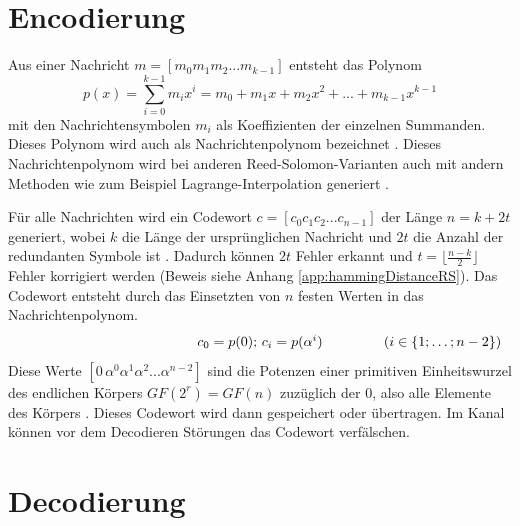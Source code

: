 \section{Encodierung}\label{sec:encoding}

Aus einer Nachricht  $m=[m_{0}m_{1}m_{2}...m_{k-1}]$ entsteht das Polynom \[p(x)=\sum_{i=0}^{k-1}m_ix^i=m_0+m_1x+m_2x^2+...+m_{k-1}x^{k-1}\] mit den Nachrichtensymbolen $m_i$ als Koeffizienten der einzelnen Summanden.
Dieses Polynom wird auch als Nachrichtenpolynom bezeichnet \cite{reedPolynomialCodesCertain1960}.
Dieses Nachrichtenpolynom wird bei anderen Reed-Solomon-Varianten auch mit andern Methoden wie zum Beispiel Lagrange-Interpolation generiert \cite{wendlingIntroductionReedSolomon2017}.

Für alle Nachrichten wird ein Codewort $c=[c_{0}c_{1}c_{2}...c_{n-1}]$ der Länge $n=k+2t$ generiert, wobei $k$ die Länge der ursprünglichen Nachricht und $2t$ die Anzahl der redundanten Symbole ist \cite{verbeureReedSolomonErrorCorrecting2022}. 
Dadurch können $2t$ Fehler erkannt und $t=\lfloor\frac{n-k}{2}\rfloor$ Fehler korrigiert werden (Beweis siehe Anhang \ref{app:hammingDistanceRS}).
Das Codewort entsteht durch das Einsetzten von $n$ festen Werten in das Nachrichtenpolynom.
\[
\makebox[\linewidth]{%
	\hfill
	$c_0=p(0);\,c_i=p(\alpha^i)$\hfill
	\llap{($i\in\{1;\dots;n-2\}$)}%
}
\]
Diese Werte $[0\,\alpha^0 \alpha^1 \alpha^2...\alpha^{n-2}]$ sind die Potenzen einer primitiven Einheitswurzel des endlichen Körpers $GF(2^r)=GF(n)$ zuzüglich der 0, also alle Elemente des Körpers \cite{weitzKonkreteMathematikNicht2021}.
Dieses Codewort wird dann gespeichert oder übertragen.
Im Kanal können vor dem Decodieren Störungen das Codewort verfälschen.

\section{Decodierung}\label{sec:decoding}

